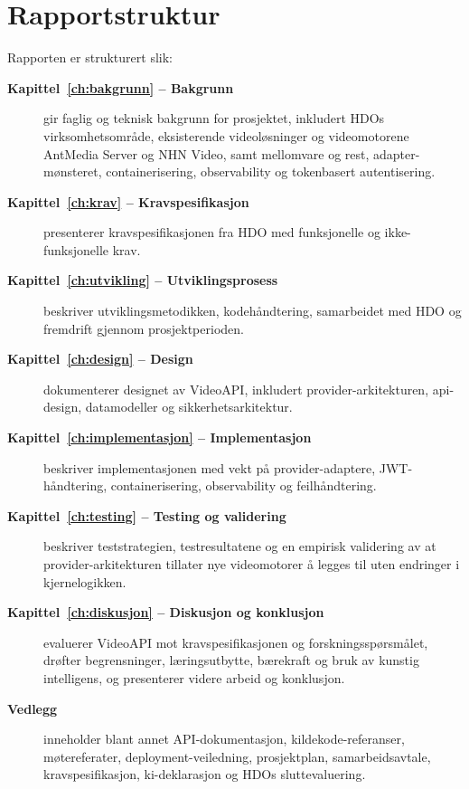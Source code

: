 \section{Rapportstruktur}

Rapporten er strukturert slik:

\begin{description}
    \item[\textbf{Kapittel~\ref{ch:bakgrunn} -- Bakgrunn}]
    gir faglig og teknisk bakgrunn for prosjektet, inkludert HDOs
    virksomhetsområde, eksisterende videoløsninger og videomotorene
    AntMedia Server og NHN Video, samt mellomvare og \gls{rest},
    adapter-mønsteret, containerisering, observability og tokenbasert
    autentisering.

    \item[\textbf{Kapittel~\ref{ch:krav} -- Kravspesifikasjon}]
    presenterer kravspesifikasjonen fra HDO med funksjonelle og
    ikke-funksjonelle krav.

    \item[\textbf{Kapittel~\ref{ch:utvikling} -- Utviklingsprosess}]
    beskriver utviklingsmetodikken, kodehåndtering, samarbeidet med HDO
    og fremdrift gjennom prosjektperioden.

    \item[\textbf{Kapittel~\ref{ch:design} -- Design}]
    dokumenterer designet av VideoAPI, inkludert provider-arkitekturen,
    \gls{api}-design, datamodeller og sikkerhetsarkitektur.

    \item[\textbf{Kapittel~\ref{ch:implementasjon} -- Implementasjon}]
    beskriver implementasjonen med vekt på provider-adaptere,
    JWT-håndtering, containerisering, observability og feilhåndtering.

    \item[\textbf{Kapittel~\ref{ch:testing} -- Testing og validering}]
    beskriver teststrategien, testresultatene og en empirisk validering
    av at provider-arkitekturen tillater nye videomotorer å legges til
    uten endringer i kjernelogikken.

    \item[\textbf{Kapittel~\ref{ch:diskusjon} -- Diskusjon og konklusjon}]
    evaluerer VideoAPI mot kravspesifikasjonen og forskningsspørsmålet,
    drøfter begrensninger, læringsutbytte, bærekraft og bruk av kunstig
    intelligens, og presenterer videre arbeid og konklusjon.

    \item[\textbf{Vedlegg}]
    inneholder blant annet API-dokumentasjon, kildekode-referanser,
    møtereferater, deployment-veiledning, prosjektplan,
    samarbeidsavtale, kravspesifikasjon, \gls{ki}-deklarasjon og HDOs
    sluttevaluering.
\end{description}